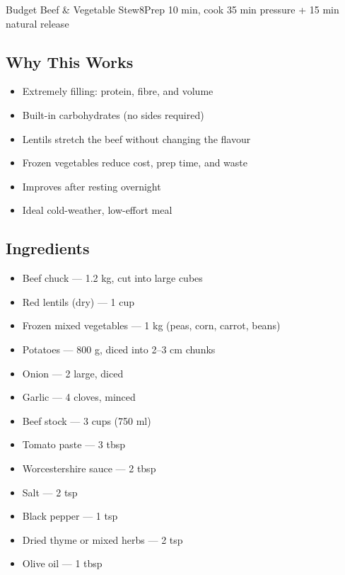 \begin{recipebox}{Budget Beef \& Vegetable Stew}{8}{Prep 10 min, cook 35 min pressure + 15 min natural release}
\subsection*{Why This Works}
\begin{itemize}
    \item Extremely filling: protein, fibre, and volume
    \item Built-in carbohydrates (no sides required)
    \item Lentils stretch the beef without changing the flavour
    \item Frozen vegetables reduce cost, prep time, and waste
    \item Improves after resting overnight
    \item Ideal cold-weather, low-effort meal
\end{itemize}

\subsection*{Ingredients}
\begin{itemize}
    \item Beef chuck — 1.2 kg, cut into large cubes
    \item Red lentils (dry) — 1 cup
    \item Frozen mixed vegetables — 1 kg (peas, corn, carrot, beans)
    \item Potatoes — 800 g, diced into 2--3 cm chunks
    \item Onion — 2 large, diced
    \item Garlic — 4 cloves, minced
    \item Beef stock — 3 cups (750 ml)
    \item Tomato paste — 3 tbsp
    \item Worcestershire sauce — 2 tbsp
    \item Salt — 2 tsp
    \item Black pepper — 1 tsp
    \item Dried thyme or mixed herbs — 2 tsp
    \item Olive oil — 1 tbsp
\end{itemize}


\end{recipebox}

